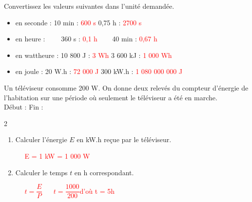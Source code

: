 \documentclass[11pt,a4paper]{article}
\newcommand{\ctext}[1]
{\begin{bclogo}[couleur = white,logo= , arrondi = 0.1,barre=none]
{}
\noindent

\vspace{-13mm}
~~
\textcolor{red}{#1}
~~
\end{bclogo}}
\begin{document}
\vfill
\newpage
{} Convertissez les valeurs suivantes dans l'unité demandée. \\

\begin{itemize}
    \item en seconde : 10 min : \textcolor{red}{600 s} \hfill  0,75 h  : \textcolor{red}{2700 s} \hspace{4.3cm} \\
\item en heure : ~~~~360 s : \textcolor{red}{0,1 h }  \hfill ~~~ 40 min  :  \textcolor{red}{0,67 h} \hspace{4.3cm} \\
\item en wattheure : 10 800 J : \textcolor{red}{3 Wh} \hspace{4.2cm}  3 600 kJ : \textcolor{red}{1 000 Wh } \hspace{4.3cm} \\
\item en joule : 20 W.h : \textcolor{red}{72 000 J} \hspace{4.5cm} 300 kW.h : \textcolor{red}{1 080 000 000 J} 
\end{itemize}

\vfill 

 Un téléviseur consomme 200 W. On donne deux relevés du compteur d'énergie de l'habitation sur une période où seulement le téléviseur a été en marche. \\

\hfill Début :  \hfill Fin  :  \hspace{3cm} \\
\begin{multicols}{2}
    
\begin{enumerate}
    \item Calculer l'énergie $E$ en kW.h reçue par le téléviseur.\\[-3mm]
    \ctext{E = 1 kW = 1 000 W}
    \item Calculer le temps $t$ en h correspondant. \\
    \ctext{$t=\dfrac{E}{P}$ ~~ $t=\dfrac{1000}{200}$d'où t = 5h}
\end{enumerate}
\end{multicols}

\vfill 
\end{document}
